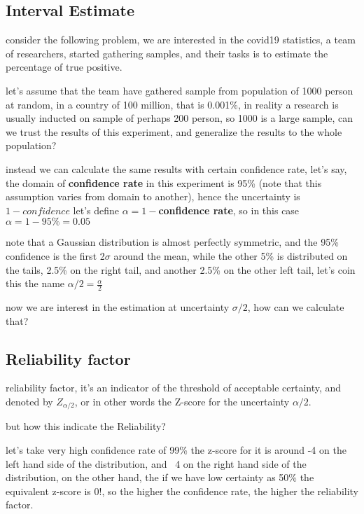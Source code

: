 \documentclass[4apaper,12pt]{book}
\begin{document}
\begin{description}
    \section{Interval Estimate}
    \begin{description}
    \item consider the following problem, we are interested in the covid19 statistics, a team of researchers, started gathering samples, and their tasks is to estimate the percentage of true positive.
    \item let's assume that the team have gathered sample from population of 1000 person at random, in a country of 100 million, that is 0.001\%, in reality a research is usually inducted on sample of perhaps 200 person, so 1000 is a large sample, can we trust the results of this experiment, and generalize the results to the whole population?
    \item instead we can calculate the same results with certain confidence rate, let's say, the domain of \textbf{confidence rate} in this experiment is 95\% (note that this assumption varies from domain to another), hence the uncertainty is $1 - confidence$ let's define $\alpha=1-$\textbf{confidence rate}, so in this case $\alpha=1-95\%=0.05$
    \item note that a Gaussian distribution is almost perfectly symmetric, and the 95\% confidence is the first 2$\sigma$ around the mean, while the other 5\% is distributed on the tails, 2.5\% on the right tail, and another 2.5\% on the other left tail, let's coin this the name $\alpha/2=\frac{\alpha}{2}$
    \item now we are interest in the estimation at uncertainty $\sigma/2$, how can we calculate that?
      \subsection{Reliability factor}
    \item reliability factor, it's an indicator of the threshold of acceptable certainty, and denoted by $Z_{\alpha/2}$, or in other words the Z-score for the uncertainty $\alpha/2$.
    \item but how this indicate the Reliability?
      \item let's take very high confidence rate of 99\% the z-score for it is around -4 on the left hand side of the distribution, and ~4 on the right hand side of the distribution, on the other hand, the if we have low certainty as 50\% the equivalent z-score is 0!, so the higher the confidence rate, the higher the reliability factor.

\end{description}
\end{description}
\end{document}
